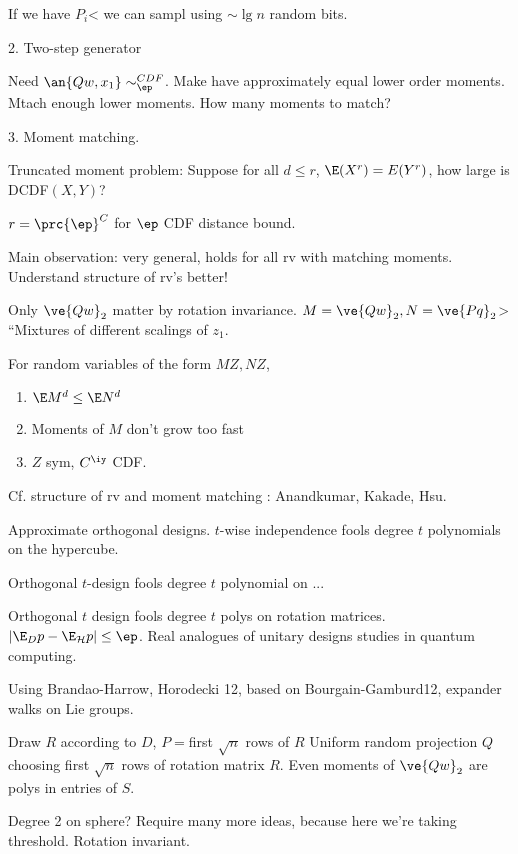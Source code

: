 If we have $P_i$< we can sampl using $\sim \lg n$ random bits.

2. Two-step generator

Need $\an{Qw,x_1}\sim_\ep^{CDF}$. Make have approximately equal lower order moments. Mtach enough lower moments. How many moments to match?

3. Moment matching.

Truncated moment problem: Suppose for all $d\le r$, $\E(X^r)=E(Y^r)$, how large is DCDF$(X,Y)$?

$r=\prc{\ep}^C$ for $\ep$ CDF distance bound.

Main observation: very general, holds for all rv with matching moments. Understand structure of rv's better!

Only $\ve{Qw}_2$ matter by rotation invariance. $M=\ve{Qw}_2,N=\ve{Pq}_2$> ``Mixtures of different scalings of $z_1$. 

For random variables of the form $MZ, NZ$, 
\begin{enumerate}
\item
$\E M^d\le \E N^d$
\item
Moments of $M$ don't grow too fast
\item
$Z$ sym, $C^\iy$ CDF. 
\end{enumerate}
 Cf. structure of rv and moment matching : Anandkumar, Kakade, Hsu.

Approximate orthogonal designs. $t$-wise independence fools degree $t$ polynomials on the hypercube.

Orthogonal $t$-design fools degree $t$ polynomial on ...

Orthogonal $t$ design fools degree $t$ polys on rotation matrices. $|\E_Dp-\E_{\cal H} p|\le \ep$. Real analogues of unitary designs studies in quantum computing. 

Using Brandao-Harrow, Horodecki 12, based on Bourgain-Gamburd12, expander walks on Lie groups.

Draw $R$ according to $D$, $P=$first $\sqrt n$ rows of $R$ 
Uniform random projection $Q$ choosing first $\sqrt n$ rows of rotation matrix $R$. Even moments of $\ve{Qw}_2$ are polys in entries of $S$. 



Degree 2 on sphere? Require many more ideas, because  here we're taking threshold. Rotation invariant. 


